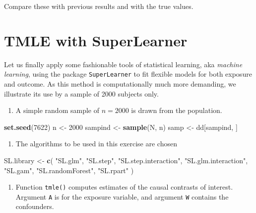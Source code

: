 \documentclass[
]{book}
\newenvironment{Shaded}{\begin{snugshade}}{\end{snugshade}}
\newcommand{\DecValTok}[1]{\textcolor[rgb]{0.00,0.00,0.81}{#1}}
\newcommand{\FunctionTok}[1]{\textcolor[rgb]{0.13,0.29,0.53}{\textbf{#1}}}
\newcommand{\NormalTok}[1]{#1}
\newcommand{\OtherTok}[1]{\textcolor[rgb]{0.56,0.35,0.01}{#1}}
\newcommand{\StringTok}[1]{\textcolor[rgb]{0.31,0.60,0.02}{#1}}
\providecommand{\tightlist}{%
  \setlength{\itemsep}{0pt}\setlength{\parskip}{0pt}}
\begin{document}
Compare these with previous results and with the true values.

\section{TMLE with SuperLearner}\label{tmle-with-superlearner}

Let us finally apply some fashionable tools of statistical learning, aka
\emph{machine learning}, using the package \texttt{SuperLearner} to fit flexible
models for both exposure and outcome. As this method is computationally
much more demanding, we illustrate its use by a sample of 2000 subjects
only.

\begin{enumerate}
\def\labelenumi{\arabic{enumi}.}
\tightlist
\item
  A simple random sample of \(n=2000\) is drawn from the population.
\end{enumerate}

\begin{Shaded}
\begin{Highlighting}[]
\FunctionTok{set.seed}\NormalTok{(}\DecValTok{7622}\NormalTok{)}
\NormalTok{n }\OtherTok{\textless{}{-}} \DecValTok{2000}
\NormalTok{sampind }\OtherTok{\textless{}{-}} \FunctionTok{sample}\NormalTok{(N, n)}
\NormalTok{samp }\OtherTok{\textless{}{-}}\NormalTok{ dd[sampind, ]}
\end{Highlighting}
\end{Shaded}

\begin{enumerate}
\def\labelenumi{\arabic{enumi}.}
\setcounter{enumi}{1}
\tightlist
\item
  The algorithms to be used in this exercise are chosen
\end{enumerate}

\begin{Shaded}
\begin{Highlighting}[]
\NormalTok{SL.library }\OtherTok{\textless{}{-}} \FunctionTok{c}\NormalTok{(}
  \StringTok{"SL.glm"}\NormalTok{, }\StringTok{"SL.step"}\NormalTok{, }\StringTok{"SL.step.interaction"}\NormalTok{,}
  \StringTok{"SL.glm.interaction"}\NormalTok{, }\StringTok{"SL.gam"}\NormalTok{,}
  \StringTok{"SL.randomForest"}\NormalTok{, }\StringTok{"SL.rpart"}
\NormalTok{)}
\end{Highlighting}
\end{Shaded}

\begin{enumerate}
\def\labelenumi{\arabic{enumi}.}
\setcounter{enumi}{2}
\tightlist
\item
  Function \texttt{tmle()} computes estimates of the causal contrasts of
  interest. Argument \texttt{A} is for the exposure variable, and argument
  \texttt{W} contains the confounders.
\end{enumerate}
\end{document}
